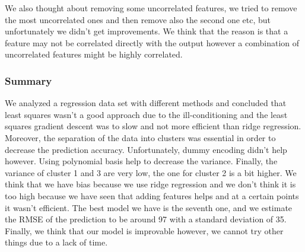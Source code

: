 \documentclass{article} %
\begin{document}
We also thought about removing some uncorrelated features, we tried to remove the most uncorrelated ones and then remove also the second one etc, but unfortunately we didn't get improvements. We think that the reason is that a feature may not be correlated directly with the output however a combination of uncorrelated features might be highly correlated. 

\subsubsection{Summary}

We analyzed a regression data set with different methods and concluded that least squares wasn't a good approach due to the ill-conditioning and the least squares gradient descent was to slow and not more efficient than ridge regression. Moreover, the separation of the data into clusters was essential in order to decrease the prediction accuracy. Unfortunately, dummy encoding didn't help however. Using polynomial basis help to decrease the variance. Finally, the variance of cluster 1 and 3 are very low, the one for cluster 2 is a bit higher. We think that we have bias because we use ridge regression and we don't think it is too high because we have seen that adding features helps and at a certain points it wasn't efficient. The best model we have is the seventh one, and we estimate the RMSE of the prediction to be around 97 with a standard deviation of 35. Finally, we think that our model is improvable however, we cannot try other things due to a lack of time.
\end{document}
